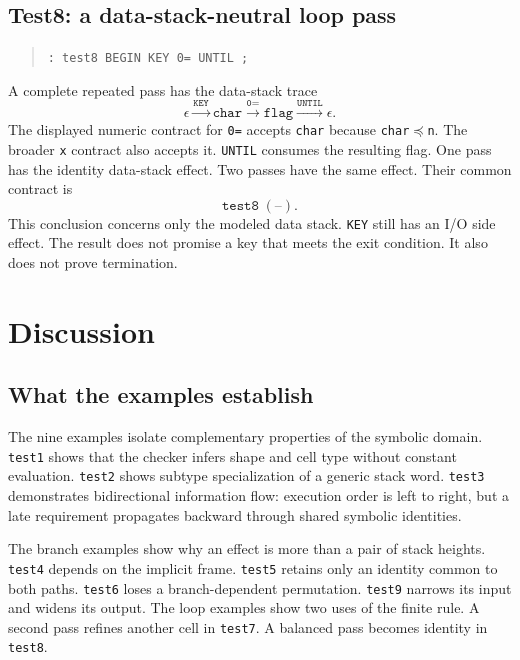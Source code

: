 \documentclass[11pt,a4paper]{article}
\begin{document}
\subsection{Test8: a data-stack-neutral loop pass}

\begin{quote}
\texttt{: test8  BEGIN KEY 0= UNTIL ;}
\end{quote}
A complete repeated pass has the data-stack trace
\[
 \epsilon
 \xrightarrow{\texttt{KEY}} \texttt{char}
 \xrightarrow{\texttt{0=}} \texttt{flag}
 \xrightarrow{\texttt{UNTIL}} \epsilon.
\]
The displayed numeric contract for \texttt{0=} accepts \texttt{char} because
\texttt{char}$\preceq$\texttt{n}.  The broader \texttt{x} contract also
accepts it.  \texttt{UNTIL} consumes the resulting flag.  One pass has the
identity data-stack effect.  Two passes have the same effect.  Their common
contract is
\[
                         \texttt{test8}\;(\texttt{--}).
\]
This conclusion concerns only the modeled data stack.  \texttt{KEY} still has
an I/O side effect.  The result does not promise a key that meets the exit
condition.  It also does not prove termination.

\section{Discussion}

\subsection{What the examples establish}

The nine examples isolate complementary properties of the symbolic domain.
\texttt{test1} shows that the checker infers shape and cell type without
constant evaluation.  \texttt{test2} shows subtype specialization of a generic
stack word.  \texttt{test3} demonstrates bidirectional information flow:
execution order is left to right, but a late requirement propagates backward
through shared symbolic identities.

The branch examples show why an effect is more than a pair of stack heights.
\texttt{test4} depends on the implicit frame.  \texttt{test5} retains only an
identity common to both paths.  \texttt{test6} loses a branch-dependent
permutation.  \texttt{test9} narrows its input and widens its output.  The loop
examples show two uses of the finite rule.  A second pass refines another cell
in \texttt{test7}.  A balanced pass becomes identity in \texttt{test8}.
\end{document}

